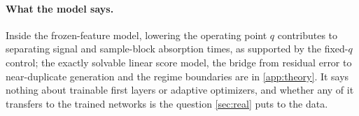 \paragraph{What the model says.}\label{sec:theory-linear}\label{sec:theory-predictor}
Inside the frozen-feature model, lowering the operating point $q$ contributes to separating signal and sample-block absorption times, as supported by the fixed-$q$ control; the exactly solvable linear score model, the bridge from residual error to near-duplicate generation and the regime boundaries are in \cref{app:theory}. It says nothing about trainable first layers or adaptive optimizers, and whether any of it transfers to the trained networks is the question \cref{sec:real} puts to the data.

